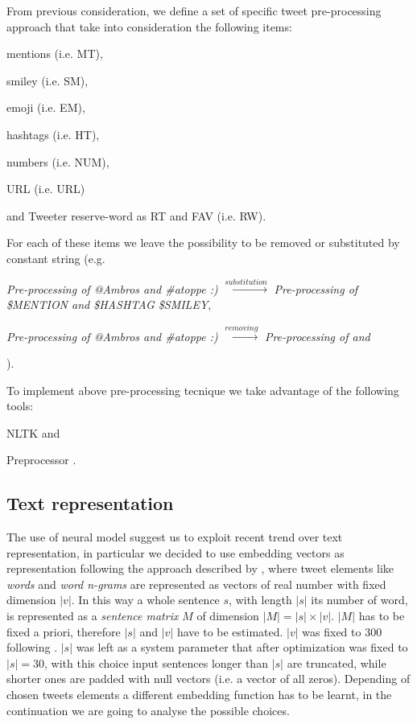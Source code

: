 From previous consideration, we define a set of specific tweet pre-processing approach that take into consideration the following items:
\begin{enumerate*}
\item mentions (i.e. MT),
\item smiley (i.e. SM),
\item emoji (i.e. EM),
\item hashtags (i.e. HT),
\item numbers (i.e. NUM),
\item URL (i.e. URL)
\item and Tweeter reserve-word as RT and FAV (i.e. RW).
\end{enumerate*}

For each of these items we leave the possibility to be removed or substituted by constant string (e.g.
\begin{enumerate*}
\item \emph{Pre-processing of @Ambros and \#atoppe :)} $\xrightarrow{substitution} $ \emph{Pre-processing of \$MENTION and \$HASHTAG \$SMILEY},
\item \emph{Pre-processing of @Ambros and \#atoppe :)} $\xrightarrow{removing} $ \emph{Pre-processing of and}
\end{enumerate*}
).

To implement above pre-processing tecnique we take advantage of the following tools:
\begin{enumerate*}
\item NLTK \cite{nltk} and 
\item Preprocessor \cite{tweets-preprocessor}.
\end{enumerate*}



\subsection{Text representation} \label{subsec:representation}

The use of neural model suggest us to exploit recent trend over text representation, in particular we decided to use embedding vectors as representation following the approach described by \cite{bojanowski2016enriching}, where tweet elements like \emph{words} and \emph{word n-grams} are represented as vectors of real number with fixed dimension $|v|$.
In this way a whole sentence $s$, with length $|s|$ its number of word, is represented as a \emph{sentence matrix} $M$ of dimension $|M| = |s| \times |v|$. $|M|$ has to be fixed a priori, therefore $|s|$ and $|v|$ have to be estimated. $|v|$ was fixed to 300 following \cite{bojanowski2016enriching}. $|s|$ was left as a system parameter that after optimization was fixed to $|s| = 30$, with this choice 
input sentences longer than $|s|$ are truncated, while shorter ones are padded with null vectors (i.e. a vector of all zeros).
Depending of chosen tweets elements a different embedding function has to be learnt, in the continuation we are going to analyse the possible choices.

